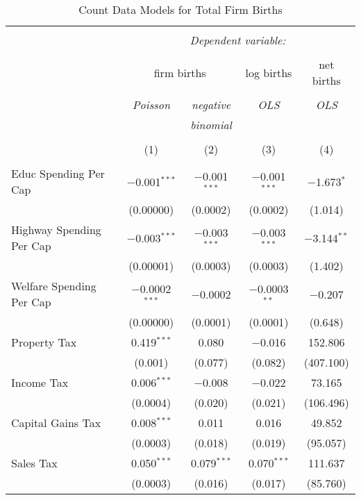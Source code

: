 
\begin{table}[!htbp] \centering 
  \caption{Count Data Models for Total Firm Births} 
  \label{} 
\begin{tabular}{@{\extracolsep{5pt}}lcccc} 
\\[-1.8ex]\hline 
\hline \\[-1.8ex] 
 & \multicolumn{4}{c}{\textit{Dependent variable:}} \\ 
\cline{2-5} 
\\[-1.8ex] & \multicolumn{2}{c}{firm births} & log births & net births \\ 
\\[-1.8ex] & \textit{Poisson} & \textit{negative} & \textit{OLS} & \textit{OLS} \\ 
 & \textit{} & \textit{binomial} & \textit{} & \textit{} \\ 
\\[-1.8ex] & (1) & (2) & (3) & (4)\\ 
\hline \\[-1.8ex] 
 Educ Spending Per Cap & $-$0.001$^{***}$ & $-$0.001$^{***}$ & $-$0.001$^{***}$ & $-$1.673$^{*}$ \\ 
  & (0.00000) & (0.0002) & (0.0002) & (1.014) \\ 
  Highway Spending Per Cap  & $-$0.003$^{***}$ & $-$0.003$^{***}$ & $-$0.003$^{***}$ & $-$3.144$^{**}$ \\ 
  & (0.00001) & (0.0003) & (0.0003) & (1.402) \\ 
  Welfare Spending Per Cap  & $-$0.0002$^{***}$ & $-$0.0002 & $-$0.0003$^{**}$ & $-$0.207 \\ 
  & (0.00000) & (0.0001) & (0.0001) & (0.648) \\ 
  Property Tax & 0.419$^{***}$ & 0.080 & $-$0.016 & 152.806 \\ 
  & (0.001) & (0.077) & (0.082) & (407.100) \\ 
  Income Tax & 0.006$^{***}$ & $-$0.008 & $-$0.022 & 73.165 \\ 
  & (0.0004) & (0.020) & (0.021) & (106.496) \\ 
  Capital Gains Tax & 0.008$^{***}$ & 0.011 & 0.016 & 49.852 \\ 
  & (0.0003) & (0.018) & (0.019) & (95.057) \\ 
  Sales Tax & 0.050$^{***}$ & 0.079$^{***}$ & 0.070$^{***}$ & 111.637 \\ 
  & (0.0003) & (0.016) & (0.017) & (85.760) \\ 

\end{tabular}
\end{table}
